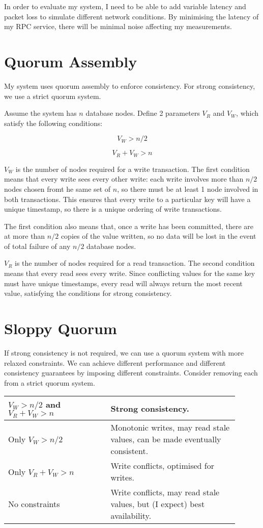\documentclass[12pt,a4paper,twoside,openright]{report}
\begin{document}
In order to evaluate my system, I need to be able to add variable latency and packet loss to simulate different network conditions. By minimising the latency of my RPC service, there will be minimal noise affecting my measurements.

\section{Quorum Assembly}

My system uses quorum assembly to enforce consistency. For strong consistency, we use a strict quorum system.

Assume the system has $n$ database nodes. Define 2 parameters $V_R$ and $V_W$, which satisfy the following conditions:

$$V_W > n / 2$$

$$V_R + V_W > n$$

$V_W$ is the number of nodes required for a write transaction. The first condition means that every write sees every other write: each write involves more than $n/2$ nodes chosen fromt he same set of $n$, so there must be at least 1 node involved in both transactions. This ensures that every write to a particular key will have a unique timestamp, so there is a unique ordering of write transactions.

The first condition also means that, once a write has been committed, there are at more than $n/2$ copies of the value written, so no data will be lost in the event of total failure of any $n/2$ database nodes.

$V_R$ is the number of nodes required for a read transaction. The second condition means that every read sees every write. Since conflicting values for the same key must have unique timestamps, every read will always return the most recent value, satisfying the conditions for strong consistency. %

\section{Sloppy Quorum}

If strong consistency is not required, we can use a quorum system with more relaxed constraints. We can achieve different performance and different consistency guarantees by imposing different constraints. Consider removing each from a strict quorum system.

\begin{tabular}{| p{0.4\linewidth} | p{0.5\linewidth} |}
\hline
$V_W > n / 2$ and $V_R + V_W > n$ & Strong consistency.\\
\hline
Only $V_W > n / 2$ & Monotonic writes, may read stale values, can be made eventually consistent.\\
\hline
Only $V_R + V_W > n$ & Write conflicts, optimised for writes.\\
\hline
No constraints & Write conflicts, may read stale values, but (I expect) best availability.\\
\hline
\end{tabular}
\end{document}
